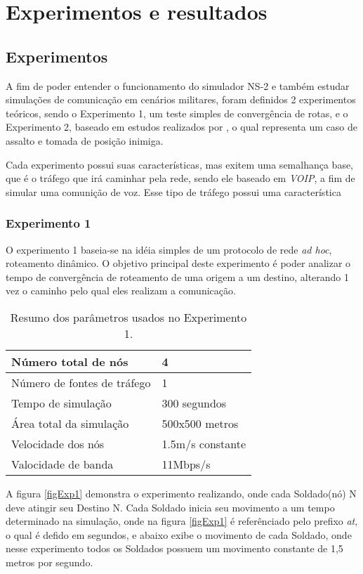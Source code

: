 \section{Experimentos e resultados}
\subsection{Experimentos}
A fim de poder entender o funcionamento do simulador NS-2 e tamb\'em estudar simula\c{c}\~oes de comunica\c{c}\~ao em cen\'arios militares, foram definidos 2 experimentos te\'oricos, sendo o Experimento 1, um teste simples de converg\^encia de rotas, e o Experimento 2, baseado em estudos realizados por \cite{pereira}, o qual representa um caso de assalto e tomada de posi\c{c}\~ao inimiga.

Cada experimento possui suas caracter\'isticas, mas exitem uma semalhan\c{c}a base, que \'e o tr\'afego que ir\'a caminhar pela rede, sendo ele baseado em \textit{VOIP}, a fim de simular uma comuni\c{c}\~ao de voz.
Esse tipo de tr\'afego possui uma caracter\'istica

\subsubsection{Experimento 1}\label{SecExp1}
O experimento 1 baseia-se na id\'eia simples de um protocolo de rede \textit{ad hoc}, roteamento din\^amico.
O objetivo principal deste experimento \'e poder analizar o tempo de converg\^encia de roteamento de uma origem a um destino, alterando 1 vez o caminho pelo qual eles realizam a comunica\c{c}\~ao.

\begin{table}[H]
	\centering
	\caption{Resumo dos par\^ametros usados no Experimento 1.}
	\begin{tabular}{ | l | l | }
		\hline
		N\'umero total de n\'os & 4 \\ \hline
		N\'umero de fontes de tr\'afego & 1 \\ \hline
		Tempo de simula\c{c}\~ao & 300 segundos \\ \hline
		\'Area total da simula\c{c}\~ao & 500x500 metros \\ \hline
		Velocidade dos n\'os & 1.5m/s constante \\ \hline
		Valocidade de banda & 11Mbps/s \\ \hline
	\end{tabular}
	\label{tabParamExp1}
\end{table}

A figura \ref{figExp1} demonstra o experimento realizando, onde cada Soldado(n\'o) N deve atingir seu Destino N.
Cada Soldado inicia seu movimento a um tempo determinado na simula\c{c}\~ao, onde na figura \ref{figExp1} \'e refer\^enciado pelo prefixo \textit{at}, o qual \'e defido em segundos, e abaixo exibe o movimento de cada Soldado, onde nesse experimento todos os Soldados possuem um movimento constante de 1,5 metros por segundo. 

